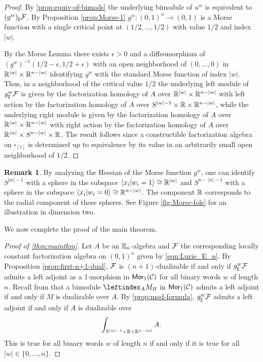 \documentclass[10pt, reqno, twoside
, final
]{amsart}
\numberwithin{equation}{subsection}%
\theoremstyle{definition}
\theoremstyle{definition}
\theoremstyle{definition}
\theoremstyle{definition}
\theoremstyle{definition}
\theoremstyle{definition}
\theoremstyle{definition}
\theoremstyle{definition}
\theoremstyle{definition}
\theoremstyle{plain}
\theoremstyle{definition}
\theoremstyle{plain}
\theoremstyle{definition}
\theoremstyle{plain}
\theoremstyle{definition}
\newtheorem{rmk}[defn]{Remark}
\theoremstyle{definition}
\theoremstyle{plain}
\theoremstyle{plain}
\theoremstyle{definition}
\theoremstyle{plain}
\theoremstyle{plain}
\theoremstyle{plain}
\begin{document}
\begin{proof}
By \cref{prop:equiv-of-bimods} the underlying bimodule of $u^w$ is equivalent to $(g^w)_{\sharp}\mathcal{F}$. By Proposition \ref{prop:Morse-1} $g^w:(0,1)^n \to (0,1)$ is a Morse function with a single critical point at $(1/2,...,1/2)$ with value $1/2$ and index $|w|$.

By the Morse Lemma there exists $\epsilon > 0$ and a diffeomorphism of $(g^{w})^{-1}(1/2-\epsilon,1/2+\epsilon)$ with an open neighborhood of $(0,...,0)$ in $\mathbb{R}^{|w|}\times \mathbb{R}^{n-|w|}$ identifying $g^{w}$ with the standard Morse function of index $|w|$. Thus, in a neighborhood of the critical value $1/2$ the underlying left module of $g^{w}_\sharp\mathcal{F}$ is given by the factorization homology of $A$ over $\mathbb{R}^{|w|}\times \mathbb{R}^{n-|w|}$ with left action by the factorization homology of $A$ over  $S^{|w|-1}\times \mathbb{R} \times \mathbb{R}^{n-|w|}$, while the underlying right module is given by the factorization homology of $A$ over $\mathbb{R}^{|w|}\times \mathbb{R}^{n-|w|}$ with right action by the factorization homology of $A$ over $\mathbb{R}^{|w|}\times S^{n-|w|} \times \mathbb{R}$. The result follows since a constructible factorization algebra on $\square_{[1]}$ is determined up to equivalence by its value in an arbitrarily small open neighborhood of $1/2$.
\end{proof}

\begin{rmk}
By analyzing the Hessian of the Morse function $g^{w}$, one can identify $S^{|w|-1}$ with a sphere in the subspace $\langle x_i| w_i =1 \rangle \cong \mathbb{R}^{|w|}$ and $S^{n - |w| - 1 } $ with a sphere in the subspace $\langle x_i | w_i = 0 \rangle \cong \mathbb{R}^{n-|w|}$. The component $\mathbb{R}$ corresponds to the radial component of these spheres. See Figure \ref{fig:Morse-fols} for an illustration in dimension two.
\end{rmk}


We now complete the proof of the main theorem.

\begin{proof}[Proof of \cref{thm:mainthm}]
Let $A$ be an $\mathbb{E}_n$-algebra and $\mathcal{F}$ the corresponding locally constant factorization algebra on $(0,1)^n$ given by \eqref{eqn:Lurie_E_n}. By Proposition \ref{prop:first-n+1-dual}, $\mathcal{F}$ is $(n+1)$-dualizable if and only if $g^w_{\sharp}\mathcal{F}$ admits a left adjoint as a 1-morphism in $\mathsf{Mor}_{1}(\mathcal{C})$ for all binary words $w$ of length $n$. Recall from \cite[Proposition 4.6.2.13]{LurHA} that a bimodule $\leftindex_{A} M_B$ in  $\mathsf{Mor}_1(\mathcal{C})$ admits a left adjoint if and only if $M$ is dualizable over $A$. By \cref{prop:mod-formula}, $g^w_{\sharp}\mathcal{F}$ admits a left adjoint if and only if $A$ is dualizable over 
\begin{equation*}
    \int_{S^{|w|-1}\times \mathbb{R} \times \mathbb{R}^{n-|w|}} A.
\end{equation*}
This is true for all binary words $w$ of length $n$ if and only if it is true for all $|w| \in \{0,...,n\}$.
\end{proof}
\end{document}
